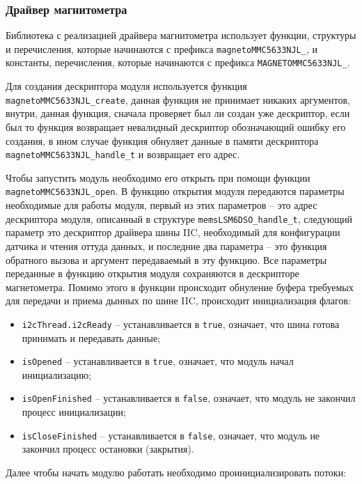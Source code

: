 \subsubsection{Драйвер магнитометра}

Библиотека с реализацией драйвера магнитометра использует функции, структуры и перечисления,
которые начинаются с префикса \lstinline{magnetoMMC5633NJL_}, и константы, перечисления, которые начинаются с префикса \lstinline{MAGNETOMMC5633NJL_}.

Для создания дескриптора модуля используется функция
\lstinline{magnetoMMC5633NJL_create}, данная функция не принимает никаких аргументов, внутри, данная функция, сначала проверяет
был ли создан уже дескриптор, если был то функция возвращает невалидный дескриптор обозначающий ошибку его создания, в ином случае
функция обнуляет данные в памяти дескриптора \lstinline{magnetoMMC5633NJL_handle_t} и возвращает его адрес. 

Чтобы запустить модуль необходимо его открыть при помощи функции
\lstinline{magnetoMMC5633NJL_open}. В функцию открытия модуля передаются параметры необходимые для работы модуля, первый из этих параметров
 -- это адрес дескриптора модуля, описанный в структуре \lstinline{memsLSM6DSO_handle_t}, следующий параметр это дескриптор драйвера шины IIC, необходимый для конфигурации датчика и чтения оттуда данных, и последние два параметра --
это функция обратного вызова и аргумент передаваемый в эту функцию. Все параметры переданные в функцию открытия модуля сохраняются в дескрипторе магнетометра.
Помимо этого в функции происходит обнуление буфера требуемых для передачи и приема дынных по шине IIC, происходит инициализация флагов:

\begin{itemize}
    \item \lstinline{i2cThread.i2cReady} -- устанавливается в \lstinline{true}, означает, что шина готова принимать и передавать данные;
    \item \lstinline{isOpened} -- устанавливается в \lstinline{true}, означает, что модуль начал инициализацию;
    \item \lstinline{isOpenFinished} -- устанавливается в \lstinline{false}, означает, что модуль не закончил процесс инициализации;
    \item \lstinline{isCloseFinished} -- устанавливается в \lstinline{false}, означает, что модуль не закончил процесс остановки (закрытия).
\end{itemize}

Далее чтобы начать модулю работать необходимо проинициализировать потоки:

